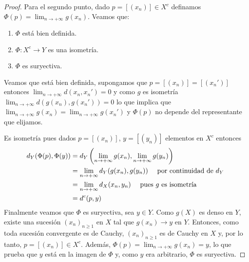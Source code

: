 \documentclass{article}
\theoremstyle{plain}
\theoremstyle{definition}
\begin{document}
\begin{proof}
    Para el segundo punto, dado \( p = [(x_n)] \in X^c \) definamos \( \Phi(p) = \lim_{n \to +\infty} g(x_n) \). Veamos que:\begin{enumerate}
        \item \( \Phi \) está bien definida.
        \item \( \Phi : X^c \to Y \) es una isometría.
        \item \( \Phi \) es suryectiva.
    \end{enumerate}
    Veamos que está bien definida, supongamos que \( p = [(x_n)] = [(x_n')] \) entonces \( \lim_{n \to +\infty} d(x_n, x_n') = 0 \) y como \( g \) es isometría
    \( \lim_{n \to +\infty} d(g(x_n), g(x_n')) = 0 \) lo que implica que \( \lim_{n \to +\infty} g(x_n) = \lim_{n \to +\infty} g(x_n') \) y \( \Phi(p) \) no depende del representante que elijamos.

    Es isometría pues dados \( p = [(x_n)] \), \( y = [(y_n)] \) elementos en \( X^c \) entonces \begin{align*}
        d_Y(\Phi(p), \Phi(y)) & = d_Y \left (\lim_{n \to +\infty} g(x_n), \lim_{n \to +\infty} g(y_n) \right )         \\
                              & = \lim_{n \to +\infty} d_Y(g(x_n), g(y_n)) \quad \text{ por continuidad de \( d_Y \) } \\
                              & = \lim_{n \to +\infty} d_X(x_n, y_n) \quad \text{ pues \( g \) es isometría }          \\
                              & = d^c(p, y)
    \end{align*}
    Finalmente veamos que \( \Phi \) es suryectiva, sea \( y \in Y \). Como \( g(X) \) es denso en \( Y \), existe una sucesión
    \( {(x_n)}_{n \geq 1} \) en \( X \) tal que \( g(x_n) \to y \) en \( Y \). Entonces, como toda sucesión convergente es de Cauchy,
    \( {(x_n)}_{n \geq 1} \) es de Cauchy en \( X \) y, por lo tanto, \( p = [(x_n)] \in X^c \). Además, \( \Phi(p) = \lim_{n \to +\infty} g(x_n) = y \), lo que prueba
    que \( y \) está en la imagen de \( \Phi \) y, como \( y \) era arbitrario, \( \Phi \) es suryectiva.
\end{proof}
\end{document}
